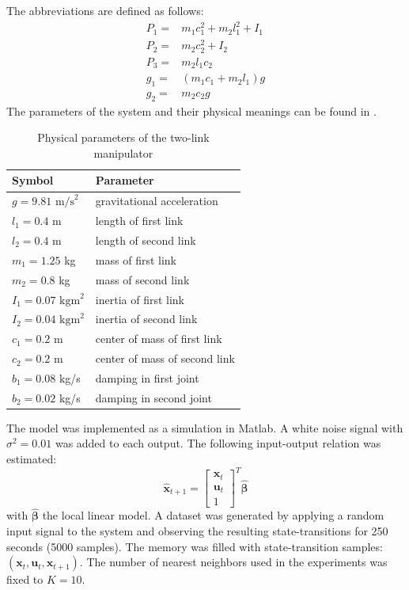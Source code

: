 The abbreviations are defined as follows:
\begin{eqnarray}
	P_1 =& m_1c_1^2 + m_2l_1^2 + I_1 \nonumber \\
	P_2 =& m_2c_2^2 + I_2 \nonumber \\
	P_3 =& m_2l_1c_2 \nonumber \\
	g_1 =& (m_1c_1 + m_2l_1)g \nonumber \\
	g_2 =& m_2c_2g \nonumber
\end{eqnarray}
The parameters of the system and their physical meanings can be found in .
\begin{table}[htbp]
	\centering
	\caption[Two-link manipulator: Parameter values]{Physical parameters of the two-link manipulator}
		\begin{tabular}{ll}
			Symbol & Parameter \\ \hline
			$g = 9.81 \textrm{ m/s}^2$ & gravitational acceleration \\
			$l_1 = 0.4$ m & length of first link \\
			$l_2 = 0.4$ m & length of second link \\
			$m_1 = 1.25$ kg & mass of first link \\ 
			$m_2 = 0.8$ kg & mass of second link \\
			$I_1 = 0.07 \textrm{ kgm}^2$ & inertia of first link \\ 
			$I_2 = 0.04 \textrm{ kgm}^2$ & inertia of second link \\ 
			$c_1 = 0.2$ m & center of mass of first link \\
			$c_2 = 0.2$ m & center of mass of second link \\
			$b_1 = 0.08$ kg/s & damping in first joint \\
			$b_2 = 0.02$ kg/s & damping in second joint
		\end{tabular}
	\label{tab:LLR-two link manipulator parameters}
\end{table}

The model was implemented as a simulation in Matlab. A white noise signal with $\sigma^2 = 0.01$ was added to each output. The following input-output relation was estimated:
$$
	\hat{\mathbf{x}}_{t+1} = \begin{bmatrix} \mathbf{x}_t \\ \mathbf{u}_t \\ 1 \end{bmatrix}^T \hat{\bm{\beta}}
$$
with $\hat{\bm{\beta}}$ the local linear model. A dataset was generated by applying a random input signal to the system and observing the resulting state-transitions for 250 seconds (5000 samples). The memory was filled with state-transition samples: $(\mathbf{x}_t,\mathbf{u}_t,\mathbf{x}_{t+1})$. The number of nearest neighbors used in the experiments was fixed to $K=10$.

